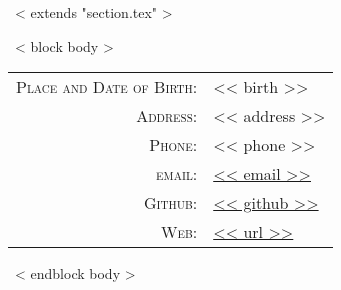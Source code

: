 ~< extends "section.tex" >~

~< block body >~
\begin{tabular}{rl}
    \textsc{Place and Date of Birth:} & << birth >> \\
    \textsc{Address:}   & << address >> \\
    \textsc{Phone:}     & << phone >> \\
    \textsc{email:}     & \href{mailto:<< email >>}{<< email >>}\\
    \textsc{Github:}     & \href{<< github >>}{<< github >>}\\
    \textsc{Web:}     & \href{<< url >>}{<< url >>}
\end{tabular}
~< endblock body >~



